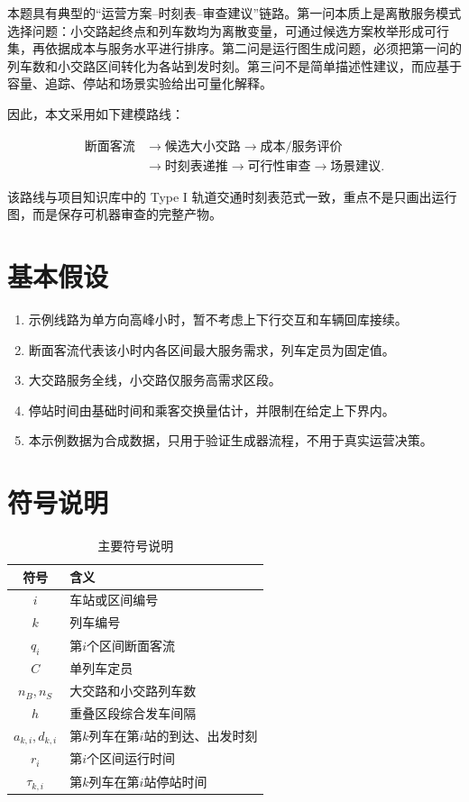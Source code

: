\documentclass[withoutpreface]{cumcmthesis}
\begin{document}
本题具有典型的“运营方案--时刻表--审查建议”链路。第一问本质上是离散服务模式选择问题：小交路起终点和列车数均为离散变量，可通过候选方案枚举形成可行集，再依据成本与服务水平进行排序。第二问是运行图生成问题，必须把第一问的列车数和小交路区间转化为各站到发时刻。第三问不是简单描述性建议，而应基于容量、追踪、停站和场景实验给出可量化解释。

因此，本文采用如下建模路线：

\[
\begin{aligned}
\text{断面客流} &\rightarrow \text{候选大小交路}
\rightarrow \text{成本/服务评价}\\
&\rightarrow \text{时刻表递推}
\rightarrow \text{可行性审查}
\rightarrow \text{场景建议}.
\end{aligned}
\]

该路线与项目知识库中的 Type I 轨道交通时刻表范式一致，重点不是只画出运行图，而是保存可机器审查的完整产物。

\section{基本假设}

\begin{enumerate}
\item 示例线路为单方向高峰小时，暂不考虑上下行交互和车辆回库接续。
\item 断面客流代表该小时内各区间最大服务需求，列车定员为固定值。
\item 大交路服务全线，小交路仅服务高需求区段。
\item 停站时间由基础时间和乘客交换量估计，并限制在给定上下界内。
\item 本示例数据为合成数据，只用于验证生成器流程，不用于真实运营决策。
\end{enumerate}

\section{符号说明}

\begin{table}[H]
\centering
\caption{主要符号说明}
\label{tab:rail-symbols}
\begin{tabular}{cl}
\toprule
符号 & 含义 \\
\midrule
$i$ & 车站或区间编号 \\
$k$ & 列车编号 \\
$q_i$ & 第$i$个区间断面客流 \\
$C$ & 单列车定员 \\
$n_B,n_S$ & 大交路和小交路列车数 \\
$h$ & 重叠区段综合发车间隔 \\
$a_{k,i},d_{k,i}$ & 第$k$列车在第$i$站的到达、出发时刻 \\
$r_i$ & 第$i$个区间运行时间 \\
$\tau_{k,i}$ & 第$k$列车在第$i$站停站时间 \\
\bottomrule
\end{tabular}
\end{table}
\end{document}
